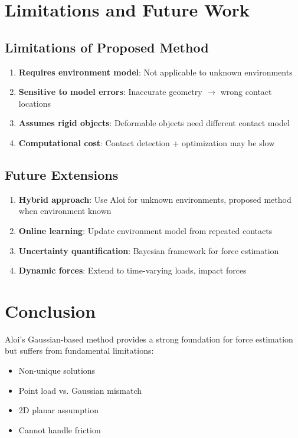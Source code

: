 \documentclass[11pt]{article}
\begin{document}
\section{Limitations and Future Work}

\subsection{Limitations of Proposed Method}

\begin{enumerate}
    \item \textbf{Requires environment model}: Not applicable to unknown environments
    \item \textbf{Sensitive to model errors}: Inaccurate geometry $\rightarrow$ wrong contact locations
    \item \textbf{Assumes rigid objects}: Deformable objects need different contact model
    \item \textbf{Computational cost}: Contact detection + optimization may be slow
\end{enumerate}

\subsection{Future Extensions}

\begin{enumerate}
    \item \textbf{Hybrid approach}: Use Aloi for unknown environments, proposed method when environment known
    \item \textbf{Online learning}: Update environment model from repeated contacts
    \item \textbf{Uncertainty quantification}: Bayesian framework for force estimation
    \item \textbf{Dynamic forces}: Extend to time-varying loads, impact forces
\end{enumerate}

\section{Conclusion}

Aloi's Gaussian-based method provides a strong foundation for force estimation but suffers from fundamental limitations:
\begin{itemize}
    \item Non-unique solutions
    \item Point load vs. Gaussian mismatch
    \item 2D planar assumption
    \item Cannot handle friction
\end{itemize}
\end{document}
